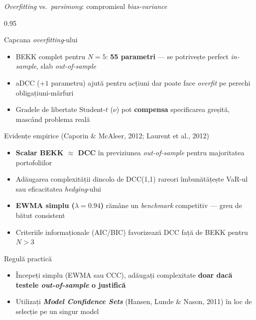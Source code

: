 \documentclass[9pt, aspectratio=169, t]{beamer}
\begin{document}
\begin{frame}{\textit{Overfitting} vs.\ \textit{parsimony}: compromisul \textit{bias-variance}}
    \begin{cminipage}{0.95\textwidth}
    \vspace{-2mm}
    {\scriptsize
    \begin{block}{Capcana \textit{overfitting}-ului}
        \begin{itemize}\setlength{\itemsep}{0pt}
            \item BEKK complet pentru $N = 5$: \textbf{55 parametri} --- se potrivește perfect \textit{in-sample}, slab \textit{out-of-sample}
            \item aDCC ($+1$ parametru) ajută pentru acțiuni dar poate face \textit{overfit} pe perechi obligațiuni-mărfuri
            \item Gradele de libertate Student-$t$ ($\nu$) pot \textbf{compensa} specificarea greșită, mascând problema reală
        \end{itemize}
    \end{block}
    \vspace{-1mm}
    \begin{block}{Evidențe empirice (Caporin \& McAleer, 2012; Laurent et al., 2012)}
        \begin{itemize}\setlength{\itemsep}{0pt}
            \item \textbf{Scalar BEKK $\approx$ DCC} în previziunea \textit{out-of-sample} pentru majoritatea portofoliilor
            \item Adăugarea complexității dincolo de DCC(1,1) rareori îmbunătățește VaR-ul sau eficacitatea \textit{hedging}-ului
            \item \textbf{EWMA simplu ($\lambda = 0.94$)} rămâne un \textit{benchmark} competitiv --- greu de bătut consistent
            \item Criteriile informaționale (AIC/BIC) favorizează DCC față de BEKK pentru $N > 3$
        \end{itemize}
    \end{block}
    \begin{alertblock}{Regulă practică}
        \begin{itemize}\setlength{\itemsep}{0pt}
            \item Începeți simplu (EWMA sau CCC), adăugați complexitate \textbf{doar dacă testele \textit{out-of-sample} o justifică}
            \item Utilizați \textbf{\textit{Model Confidence Sets}} (Hansen, Lunde \& Nason, 2011) în loc de selecție pe un singur model
        \end{itemize}
    \end{alertblock}
    }
    \end{cminipage}
\end{frame}
\end{document}
